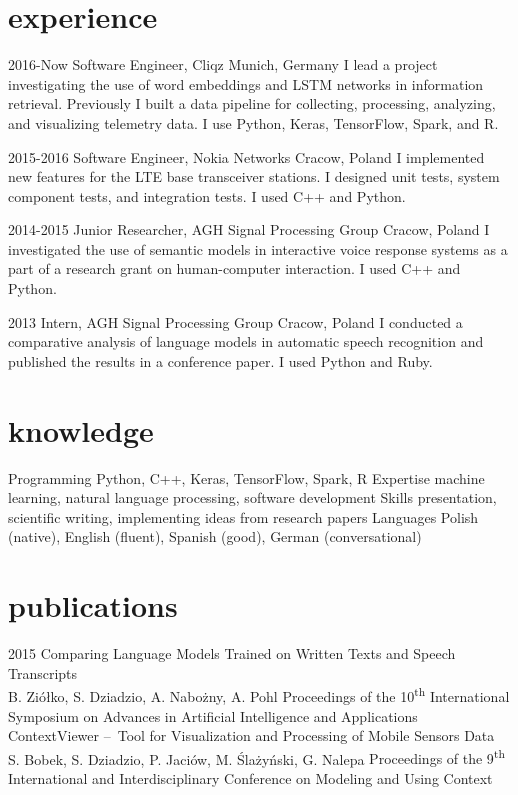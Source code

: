 \documentclass[]{friggeri-cv_osx}
\begin{document}
\section{experience}
\begin{entrylist}
\entry
{2016-Now}
{Software Engineer, Cliqz}
{Munich, Germany}
{I lead a project investigating the use of word embeddings and LSTM networks in information retrieval. Previously I built a data pipeline for collecting, processing, analyzing, and visualizing telemetry data. I use Python, Keras, TensorFlow, Spark, and R.\\}

\entry
{2015-2016}
{Software Engineer, Nokia Networks}
{Cracow, Poland}
{I implemented new features for the LTE base transceiver stations. I designed unit tests, system component tests, and integration tests. I used C++ and Python.\\}

\entry
{2014-2015}
{Junior Researcher, AGH Signal Processing Group}
{Cracow, Poland}
{I investigated the use of semantic models in interactive voice response systems as a part of a research grant on human-computer interaction. I used C++ and Python.\\}

\entry
{2013}
{Intern, AGH Signal Processing Group}
{Cracow, Poland}
{I conducted a comparative analysis of language models in automatic speech recognition and published the results in a conference paper. I used Python and Ruby.\\}
\end{entrylist}

\section{knowledge}
\begin{entrylist}
\entry
{}
{Programming}
{}
{Python, C++, Keras, TensorFlow, Spark, R}
\entry
{}
{Expertise}
{}
{machine learning, natural language processing, software development}
\entry
{}
{Skills}
{}
{presentation, scientific writing, implementing ideas from research papers}
\entry
{}
{Languages}
{}
{Polish (native), English (fluent), Spanish (good), German (conversational)}
\end{entrylist}

\section{publications}
\begin{entrylist}
\entry
{2015}
{Comparing Language Models Trained on Written Texts and Speech Transcripts\\}
{B. Ziółko, S. Dziadzio, A. Nabożny, A. Pohl}
{Proceedings of the 10\textsuperscript{th} International Symposium on Advances in Artificial Intelligence and Applications\\}
\entry
{}
{ContextViewer – Tool for Visualization and Processing of Mobile Sensors Data\\}
{S. Bobek, S. Dziadzio, P. Jaciów, M. Ślażyński, G. Nalepa}
{Proceedings of the 9\textsuperscript{th} International and Interdisciplinary Conference on Modeling and Using Context}
\end{entrylist}
\end{document}

